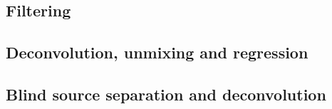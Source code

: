 \subsection{Filtering}



\subsection{Deconvolution, unmixing and regression}




\subsection{Blind source separation and deconvolution}




